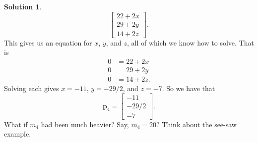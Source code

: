 \documentclass[12pt]{report} %
\theoremstyle{definition}
\newtheorem{solution}{Solution}
\begin{document}
\begin{solution}
\[\begin{bmatrix} 22+2x\\ 29+2y\\ 14+2z\end{bmatrix}.
\]
This gives us an equation for $x$, $y$, and $z$, all of which we know how to solve. That is
\begin{align*}
    0&= 22+2x\\
    0&= 29+2y\\
    0&= 14+2z.
\end{align*}
Solving each gives $x=-11$, $y=-29/2$, and $z=-7$. So we have that
\[
\mathbf{p}_4 = \begin{bmatrix} -11\\ -29/2\\ -7 \end{bmatrix}.
\]
What if $m_4$ had been much heavier? Say, $m_4=20$? Think about the see-saw example.
\end{solution}
\hspace{.5cm}
\end{document}
